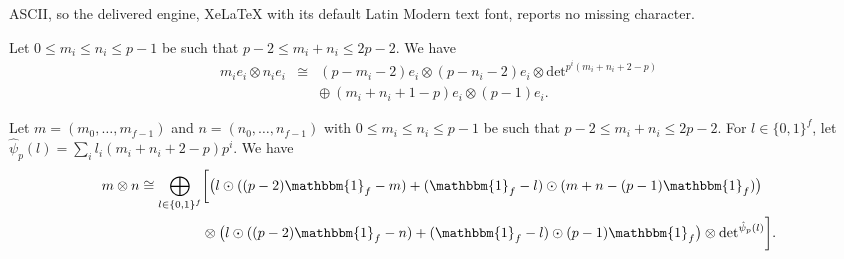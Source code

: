 \documentclass[10pt,a4paper]{amsart}
\renewcommand{\leq}{\leqslant}
\begin{document}
ASCII, so the delivered engine, XeLaTeX with its default Latin Modern text font, reports no missing character.
\begin{lemma}
     \label{largeweightsf}
     Let $0\le m_i\le n_i\le p-1$ be such that $p-2\le m_i+n_i\le 2p-2.$ We have 
     \begin{eqnarray*}
        m_ie_i\otimes n_ie_i&\cong& (p-m_i-2)e_i\otimes (p-n_i-2)e_i\otimes \mathrm{det}^{p^i(m_i+n_i+2-p)}\\
        &&\oplus~ (m_i+n_i + 1 - p)e_i\otimes (p-1)e_i.
     \end{eqnarray*}
\end{lemma}

\begin{cor}
    Let $m = (m_0,\ldots,m_{f-1})$ and  $n = (n_0,\ldots,n_{f-1})$ with $0 \leq m_i \leq n_i \leq p-1$ be such that $p-2 \leq m_i + n_i \leq 2p-2$. For $l \in \{0,1\}^f$, let $\hat\psi_p(l) = \sum_i l_i (m_i + n_i + 2 - p)p^i$. We have
    \begin{align*}
    m \otimes n \cong \bigoplus_{l \in \{0,1\}^f}&\bigg[\big( l \odot ((p-2)\mathbbm{1}_f - m) + (\mathbbm{1}_f - l)\odot(m + n - (p-1)\mathbbm{1}_f)\big)\\
    &\otimes \big( l\odot ((p-2)\mathbbm{1}_f - n) + (\mathbbm{1}_f - l)\odot(p-1)\mathbbm{1}_f \big) \otimes \mathrm{det}^{\hat\psi_p(l)}\bigg].
    \end{align*}
\end{cor}
\end{document}
